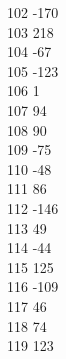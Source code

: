 { 102	-170 \\
 103	218 \\
 104	-67 \\
 105	-123 \\
 106	1 \\
 107	94 \\
 108	90 \\
 109	-75 \\
 110	-48 \\
 111	86 \\
 112	-146 \\
 113	49 \\
 114	-44 \\
 115	125 \\
 116	-109 \\
 117	46 \\
 118	74 \\
 119	123 \\
}

